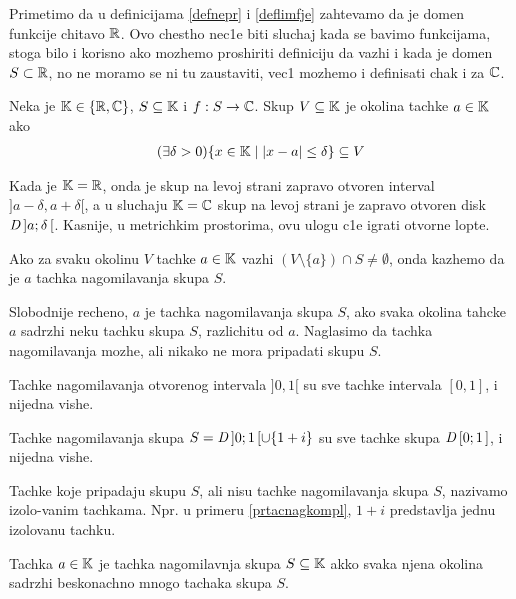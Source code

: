 \documentclass[../main_og.tex]{subfiles}
\begin{document}
    
    Primetimo da u definicijama \ref{defnepr} i \ref{deflimfje} zahtevamo da je domen funkcije chitavo $\mathbb{R}$.
    Ovo chestho nec1e biti sluchaj kada se bavimo funkcijama, stoga bilo i korisno ako mozhemo proshiriti definiciju da vazhi i kada je domen  $S \subset \mathbb{R}$,
    no ne moramo se ni tu zaustaviti, vec1 mozhemo i definisati chak i za $\mathbb{C}$.
    
    \begin{de}
    Neka je $\mathbb{K}\in \{\mathbb{R}, \mathbb{C}\}$, $S\subseteq\mathbb{K}$ i $f:S \to \mathbb{C}$. Skup $V\subseteq \mathbb{K}$ je okolina tachke $a\in \mathbb{K}$ ako 
    \begin{align}
        \label{defokolina}
        (\exists \delta > 0 )\{x\in \mathbb{K} \mid |x-a|\leq \delta\}\subseteq V
    \end{align}
    \end{de}

    Kada je $\mathbb{K}=\mathbb{R}$, onda je skup na levoj strani zapravo otvoren interval $]a-\delta,a+\delta[$,
    a u sluchaju $\mathbb{K}=\mathbb{C}$ skup na levoj strani je zapravo otvoren disk $\mathit{D}\,]a;\delta\,[$. Kasnije, u metrichkim prostorima, ovu ulogu c1e igrati otvorne lopte.
    
    \begin{de}
        Ako za svaku okolinu $V$ tachke $a\in \mathbb{K}$ vazhi $(V\setminus \{a\})\cap S \neq \emptyset$, onda kazhemo da je $a$ tachka nagomilavanja skupa $S$.
    \end{de}

    Slobodnije recheno, $a$ je tachka nagomilavanja skupa $S$, ako svaka okolina tahcke $a$ sadrzhi neku tachku skupa $S$, razlichitu od $a$. 
    Naglasimo da tachka nagomilavanja mozhe, ali nikako ne mora pripadati skupu $S$. 

    \begin{pr}
        Tachke nagomilavanja otvorenog intervala $]0,1[$ su sve tachke intervala $[0,1]$, i nijedna vishe.
    \end{pr}
    \begin{pr}
        \label{prtacnagkompl}
        Tachke nagomilavanja skupa $S=\mathit{D}\,]0;1\,[\cup \{1+i\}$ su sve tachke skupa $\mathit{D}\,[0;1\,]$, i nijedna vishe.
    \end{pr}

    Tachke koje pripadaju skupu $S$, ali nisu tachke nagomilavanja skupa $S$, nazivamo izolo-vanim tachkama.
    Npr. u  primeru \ref{prtacnagkompl}, $1+i$ predstavlja jednu izolovanu tachku.

    \begin{tvr}
        Tachka $a \in \mathbb{K}$ je tachka nagomilavnja skupa $S \subseteq \mathbb{K}$ akko svaka njena okolina sadrzhi beskonachno mnogo tachaka skupa $S$.
    \end{tvr}
\end{document}
